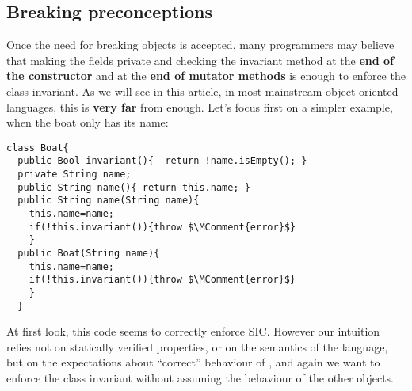 \subsection{Breaking preconceptions}
Once the need for breaking objects is accepted, 
many programmers may believe that making the fields private and checking the invariant method
at the \textbf{end of the constructor} and at the \textbf{end of mutator methods} is enough to enforce the 
class invariant.
As we will see in this article, in most mainstream object-oriented languages, this is \textbf{very far} from enough.
Let's focus first on a simpler example, when the boat only has its name:
\begin{lstlisting}
class Boat{
  public Bool invariant(){  return !name.isEmpty(); }
  private String name;
  public String name(){ return this.name; }
  public String name(String name){
    this.name=name;
    if(!this.invariant()){throw $\MComment{error}$}
    }
  public Boat(String name){
    this.name=name;
    if(!this.invariant()){throw $\MComment{error}$}
    }
  }
\end{lstlisting}
\noindent At first look, this code seems to correctly enforce SIC.
However our intuition relies not on statically verified properties, or on the semantics of the language,
but on the expectations about ``correct'' behaviour of \Q@String@, and again
we want to enforce the class invariant without assuming the behaviour of the other objects.
